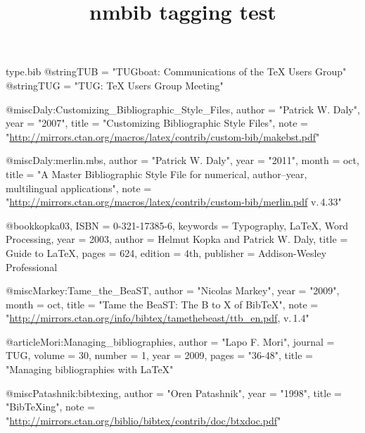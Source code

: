 \begin{filecontents}[noheader]{type.bib}
@string{TUB = "TUGboat: Communications of the {\TeX} Users Group"}
@string{TUG = "TUG: {\TeX} Users Group Meeting"}

@misc{Daly:Customizing_Bibliographic_Style_Files,
	author = "Patrick W. Daly",
	year = "2007",
	title = "Customizing Bibliographic Style Files",
	note = "\url{http://mirrors.ctan.org/macros/latex/contrib/custom-bib/makebst.pdf}"
}

@misc{Daly:merlin.mbs,
	author = "Patrick W. Daly",
	year = "2011",
	month = oct,
	title = "{A Master Bibliographic Style File for numerical, author--year, multilingual applications}",
	note = "\url{http://mirrors.ctan.org/macros/latex/contrib/custom-bib/merlin.pdf} v.\,4.33"
}

@book{kopka03,
	ISBN = {0-321-17385-6},
	keywords = {Typography, LaTeX, Word Processing},
	year = {2003},
	author = {Helmut Kopka and Patrick W. Daly},
	title = {Guide to LaTeX},
	pages = {624},
	edition = {4th},
	publisher = {Addison-Wesley Professional}
}

@misc{Markey:Tame_the_BeaST,
	author = "Nicolas Markey",
	year = "2009",
	month = oct,
	title = "{Tame the BeaST: The B to X of Bib{\TeX}}",
	note = "\url{http://mirrors.ctan.org/info/bibtex/tamethebeast/ttb_en.pdf}, v.\,1.4"
}

@article{Mori:Managing_bibliographies,
	author = "Lapo F. Mori",
	journal = TUG,
	volume = 30,
	number = 1,
	year = 2009,
	pages = "36-48",
	title = "Managing bibliographies with {\LaTeX}"
}

@misc{Patashnik:bibtexing,
	author = "Oren Patashnik",
	year = "1998",
	title = "Bib{\TeX}ing",
	note = "\url{http://mirrors.ctan.org/biblio/bibtex/contrib/doc/btxdoc.pdf}"
}
\end{filecontents}
\documentclass{article}
\usepackage{nmbib}
\usepackage{hyperref}

\title{nmbib tagging test}



\citep{Daly:Customizing_Bibliographic_Style_Files}

\citet{kopka03}

\citeauthor{Daly:Natbib}

\citeyear{Mori:Managing_bibliographies}


